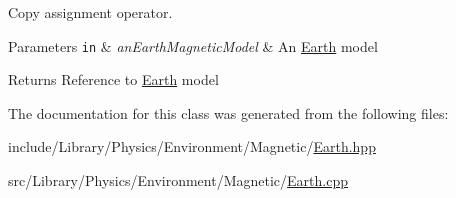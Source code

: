 Copy assignment operator. 


\begin{DoxyParams}[1]{Parameters}
\mbox{\tt in}  & {\em an\+Earth\+Magnetic\+Model} & An \hyperlink{classlibrary_1_1physics_1_1environment_1_1magnetic_1_1_earth}{Earth} model \\
\hline
\end{DoxyParams}
\begin{DoxyReturn}{Returns}
Reference to \hyperlink{classlibrary_1_1physics_1_1environment_1_1magnetic_1_1_earth}{Earth} model 
\end{DoxyReturn}


The documentation for this class was generated from the following files\+:\begin{DoxyCompactItemize}
\item 
include/\+Library/\+Physics/\+Environment/\+Magnetic/\hyperlink{_magnetic_2_earth_8hpp}{Earth.\+hpp}\item 
src/\+Library/\+Physics/\+Environment/\+Magnetic/\hyperlink{_magnetic_2_earth_8cpp}{Earth.\+cpp}\end{DoxyCompactItemize}
